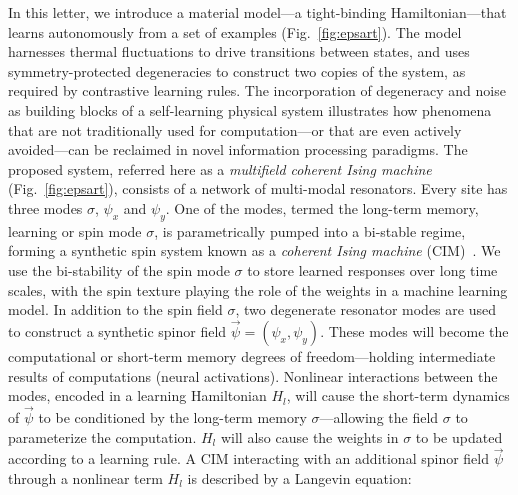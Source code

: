 In this letter, we introduce a material model---a tight-binding Hamiltonian---that learns autonomously from a set of examples (Fig.~\ref{fig:epsart}). The model harnesses thermal fluctuations to drive transitions between states, and uses symmetry-protected degeneracies to construct two copies of the system, as required by contrastive learning rules. The incorporation of degeneracy and noise as building blocks of a self-learning physical system illustrates how phenomena that are not traditionally used for computation---or that are even actively avoided---can be reclaimed in novel information processing paradigms. The proposed system, referred here as a \emph{multifield coherent Ising machine} (Fig.~\ref{fig:epsart}), consists of a network of multi-modal resonators. Every site has three modes $\sigma$, $\psi_x$ and $\psi_y$. One of the modes, termed the long-term memory, learning or spin mode $\sigma$, is parametrically pumped into a bi-stable regime, forming a synthetic spin system known as a \emph{coherent Ising machine} (CIM)~\cite{coherentIsingExperiment, PhysRevResearch.4.013149}. We use the bi-stability of the spin mode $\sigma$ to store learned responses over long time scales, with the spin texture playing the role of the weights in a machine learning model. In addition to the spin field $\sigma$, two degenerate resonator modes are used to construct a synthetic spinor field $\vec{\psi}=(\psi_x, \psi_y)$. These modes will become the computational or short-term memory degrees of freedom---holding intermediate results of computations (neural activations). Nonlinear interactions between the modes, encoded in a learning Hamiltonian $H_l$, will cause the short-term dynamics of $\vec{\psi}$ to be conditioned by the long-term memory $\sigma$---allowing the field $\sigma$ to parameterize the computation. $H_l$ will also cause the weights in $\sigma$ to be updated according to a learning rule. A CIM interacting with an additional spinor field $\vec{\psi}$ through a nonlinear term $H_l$ is described by a Langevin equation:


